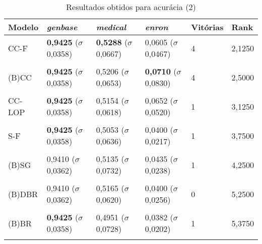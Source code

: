 \begin{table}[htbp]
	\centering
	\caption{Resultados obtidos para acurácia (2)}
		\begin{tabular}
        { p{0.88in} p{0.88in} p{0.88in} p{0.88in} p{0.88in} p{0.88in} }
        
        \hline
Modelo & \textit{genbase} & \textit{medical} & \textit{enron} & \textbf{Vitórias} & \textbf{Rank} \\ 
\hline

CC-F & \textbf{0,9425} \newline ($\sigma$ 0,0358) & \textbf{0,5288} \newline ($\sigma$ 0,0667) & 0,0605 \newline ($\sigma$ 0,0467) & 4 & 2,1250 \\ \\
(B)CC & \textbf{0,9425} \newline ($\sigma$ 0,0358) & 0,5206 \newline ($\sigma$ 0,0653) & \textbf{0,0710} \newline ($\sigma$ 0,0830) & 4 & 2,5000 \\ \\
CC-LOP & \textbf{0,9425} \newline ($\sigma$ 0,0358) & 0,5154 \newline ($\sigma$ 0,0618) & 0,0652 \newline ($\sigma$ 0,0520) & 1 & 3,1250 \\ \\
S-F & \textbf{0,9425} \newline ($\sigma$ 0,0358) & 0,5053 \newline ($\sigma$ 0,0636) & 0,0400 \newline ($\sigma$ 0,0217) & 1 & 3,7500 \\ \\
(B)SG & 0,9410 \newline ($\sigma$ 0,0362) & 0,5135 \newline ($\sigma$ 0,0732) & 0,0435 \newline ($\sigma$ 0,0238) & 1 & 4,2500 \\ \\
(B)DBR & 0,9410 \newline ($\sigma$ 0,0362) & 0,5165 \newline ($\sigma$ 0,0620) & 0,0400 \newline ($\sigma$ 0,0256) & 0 & 5,2500 \\ \\
(B)BR & \textbf{0,9425} \newline ($\sigma$ 0,0358) & 0,4951 \newline ($\sigma$ 0,0728) & 0,0382 \newline ($\sigma$ 0,0202) & 1 & 5,3750 \\ \\

        \hline
        \end{tabular}
	\label{tab:metricsForaccuracy_2}
\end{table}

